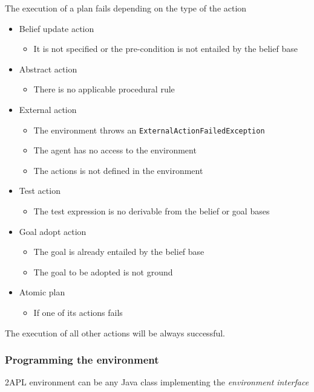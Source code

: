 \documentclass[a4paper]{article}
\begin{document}
The execution of a plan fails depending on the type of the action
\begin{itemize}
	\item Belief update action
		\begin{itemize}
			\item  It is not specified or the pre-condition is not entailed by the belief base
		\end{itemize}
	\item Abstract action
		\begin{itemize}
			\item There is no applicable procedural rule 
		\end{itemize}
	\item External action
		\begin{itemize}
			\item The environment throws an \texttt{ExternalActionFailedException}
			\item The agent has no access to the environment
			\item The actions is not defined in the environment
		\end{itemize}
	\item Test action 
		\begin{itemize}
			\item The test expression is no derivable from the belief or goal bases
		\end{itemize}
	\item Goal adopt action
		\begin{itemize}
			\item The goal is already entailed by the belief base
			\item The goal to be adopted is not ground
		\end{itemize}
	\item Atomic plan
		\begin{itemize}
			\item If one of its actions fails
	  \end{itemize}
\end{itemize}

The execution of all other actions will be always successful.

\subsubsection{Programming the environment} %

2APL environment can be any Java class implementing the \emph{environment interface}
\end{document}
